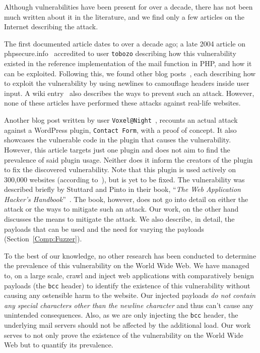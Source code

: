 Although \ehi vulnerabilities have been present for over a decade, there has not been much written about it in the literature, and we find only a few articles on the Internet describing the attack.

The first documented article dates to over a decade ago; a late 2004 article on phpsecure.info~\cite{Tobozo} accredited to user \lstinline|tobozo| describing how this vulnerability existed in the reference implementation of the mail function in PHP, and how it can be exploited. Following this, we found other blog posts~\cite{Calin, DK, Injection2, Nicol, Pope}, each describing how to exploit the vulnerability by using newlines to camouflage headers inside user input. A wiki entry~\cite{Injection} also describes the ways to prevent such an attack. However, none of these articles have performed these attacks against real-life websites.

Another blog post written by user \lstinline|Voxel@Night|~\cite{Tendencies2014}, recounts an actual attack against a WordPress plugin, \texttt{Contact Form}, with a proof of concept\footnotemark. It also showcases the vulnerable code in the plugin that causes the vulnerability. However, this article targets just one plugin and does not aim to find the prevalence of said plugin usage. Neither does it inform the creators of the plugin to fix the discovered vulnerability. Note that this plugin is used actively on 300,000 websites (according to~\cite{BestWebSoft2016}), but is yet to be fixed.
The vulnerability was described briefly by Stuttard and Pinto in their book, ``\emph{The Web Application Hacker's Handbook}''~\cite{stuttard2011web}. The book, however, does not go into detail on either the attack or the ways to mitigate such an attack. Our work, on the other hand discusses the means to mitigate the attack. We also describe, in detail, the payloads that can be used and the need for varying the payloads (Section~\ref{Comp:Fuzzer}).

To the best of our knowledge, no other research has been conducted to determine the prevalence of this vulnerability on the World Wide Web. We have managed to, on a large scale, crawl and inject web applications with comparatively benign payloads (the \texttt{bcc} header) to identify the existence of this vulnerability without causing any ostensible harm to the website. Our injected payloads \emph{do not contain any special characters other than the newline character} and thus can't cause any unintended consequences. Also, as we are only injecting the \texttt{bcc} header, the underlying mail servers should not be affected by the additional load. Our work serves to not only prove the existence of the vulnerability on the World Wide Web but to quantify its prevalence.
